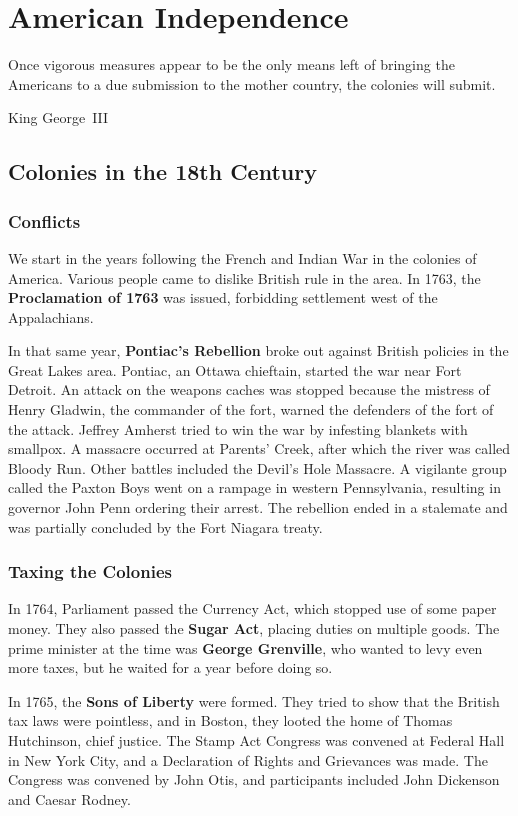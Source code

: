 \chapter{American Independence}

\epigraph{%
  Once vigorous measures appear to be the only means left
  of bringing the Americans to a due submission to the mother country,
  the colonies will submit.
}{King George~III}

\section{Colonies in the 18th Century}

\subsection*{Conflicts}

We start in the years following the French and Indian War in the colonies of America.
Various people came to dislike British rule in the area.
In 1763, the \textbf{Proclamation of 1763} was issued, forbidding settlement west of the Appalachians.

In that same year,
\textbf{Pontiac's Rebellion} broke out against British policies in the Great Lakes area.
Pontiac, an Ottawa chieftain, started the war near Fort Detroit.
An attack on the weapons caches was stopped because the mistress of Henry Gladwin, the commander of the fort,
warned the defenders of the fort of the attack.
Jeffrey Amherst tried to win the war by infesting blankets with smallpox.
A massacre occurred at Parents' Creek, after which the river was called Bloody Run.
Other battles included the Devil's Hole Massacre.
A vigilante group called the Paxton Boys went on a rampage in western Pennsylvania,
resulting in governor John Penn ordering their arrest.
The rebellion ended in a stalemate and was partially concluded by the Fort Niagara treaty.

\subsection*{Taxing the Colonies}

In 1764, Parliament passed the Currency Act, which stopped use of some paper money.
They also passed the \textbf{Sugar Act}, placing duties on multiple goods.
The prime minister at the time was \textbf{George Grenville}, who wanted to levy even more taxes,
but he waited for a year before doing so.

In 1765, the \textbf{Sons of Liberty} were formed.
They tried to show that the British tax laws were pointless,
and in Boston, they looted the home of Thomas Hutchinson, chief justice.
The Stamp Act Congress was convened at Federal Hall in New York City,
and a Declaration of Rights and Grievances was made.
The Congress was convened by John Otis, and participants included John Dickenson and Caesar Rodney.

